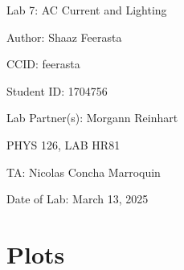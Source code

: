 \documentclass[12pt]{article}
\begin{document}
\pagebreak
\begin{titlepage}
    \begin{center}
        \vspace*{\fill}
        Lab 7: AC Current and Lighting

        Author: Shaaz Feerasta

        CCID: feerasta

        Student ID: 1704756

        Lab Partner(s): Morgann Reinhart

        PHYS 126, LAB HR81

        TA: Nicolas Concha Marroquin

        Date of Lab: March 13, 2025
        \vspace*{\fill}
    \end{center}
\end{titlepage}

\section{Plots}
\end{document}
